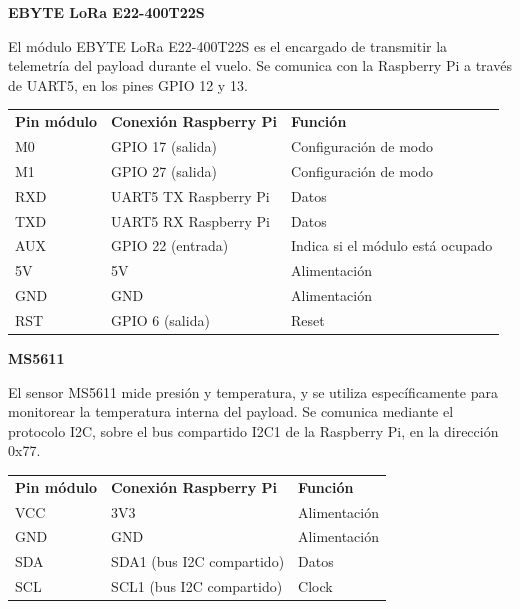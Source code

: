 \documentclass[12pt,a4paper]{article}
\newcounter{none} %
\begin{document}
\textbf{EBYTE LoRa E22-400T22S}

El módulo EBYTE LoRa E22-400T22S es el encargado de transmitir la telemetría del payload durante el vuelo. Se comunica con la Raspberry Pi a través de UART5, en los pines GPIO 12 y 13.

{\def\LTcaptype{none} %
\begin{longtable}[]{@{}
  >{\centering\arraybackslash}p{}
  >{\centering\arraybackslash}p{}
  >{\centering\arraybackslash}p{}@{}}
\toprule\noalign{}
\endhead
\bottomrule\noalign{}
\endlastfoot
\textbf{Pin módulo} & \textbf{Conexión Raspberry Pi} & \textbf{Función} \\
M0 & GPIO 17 (salida) & Configuración de modo \\
M1 & GPIO 27 (salida) & Configuración de modo \\
RXD & UART5 TX Raspberry Pi & Datos \\
TXD & UART5 RX Raspberry Pi & Datos \\
AUX & GPIO 22 (entrada) & Indica si el módulo está ocupado \\
5V & 5V & Alimentación \\
GND & GND & Alimentación \\
RST & GPIO 6 (salida) & Reset \\
\end{longtable}
}

\textbf{MS5611}

El sensor MS5611 mide presión y temperatura, y se utiliza específicamente para monitorear la temperatura interna del payload. Se comunica mediante el protocolo I2C, sobre el bus compartido I2C1 de la Raspberry Pi, en la dirección 0x77.

{\def\LTcaptype{none} %
\begin{longtable}[]{@{}
  >{\centering\arraybackslash}p{}
  >{\centering\arraybackslash}p{}
  >{\centering\arraybackslash}p{}@{}}
\toprule\noalign{}
\endhead
\bottomrule\noalign{}
\endlastfoot
\textbf{Pin módulo} & \textbf{Conexión Raspberry Pi} & \textbf{Función} \\
VCC & 3V3 & Alimentación \\
GND & GND & Alimentación \\
SDA & SDA1 (bus I2C compartido) & Datos \\
SCL & SCL1 (bus I2C compartido) & Clock \\
\end{longtable}
}
\end{document}
